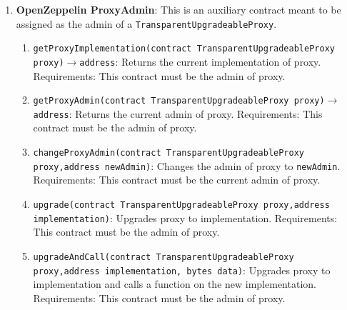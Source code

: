 \begin{enumerate}
\item\textbf{OpenZeppelin ProxyAdmin}: This is an auxiliary contract meant to be assigned as the admin of a \verb|TransparentUpgradeableProxy|.
	\begin{enumerate}
	\item\verb|getProxyImplementation(contract TransparentUpgradeableProxy proxy)|$\rightarrow$\verb|address|: Returns the current implementation of proxy. Requirements: This contract must be the admin of proxy.
	\item\verb|getProxyAdmin(contract TransparentUpgradeableProxy proxy)|$\rightarrow$\verb|address|: Returns the current admin of proxy. Requirements: This contract must be the admin of proxy.
	\item\verb|changeProxyAdmin(contract TransparentUpgradeableProxy proxy,|\linebreak\verb|address newAdmin)|: Changes the admin of proxy to \verb|newAdmin|. Requirements: This contract must be the current admin of proxy.
	\item\verb|upgrade(contract TransparentUpgradeableProxy proxy,|\linebreak\verb|address implementation)|: Upgrades proxy to implementation. Requirements: This contract must be the admin of proxy.
	\item\verb|upgradeAndCall(contract TransparentUpgradeableProxy proxy,|\linebreak\verb|address implementation, bytes data)|: Upgrades proxy to implementation and calls a function on the new implementation. Requirements: This contract must be the admin of proxy.
	\end{enumerate}


\end{enumerate}
